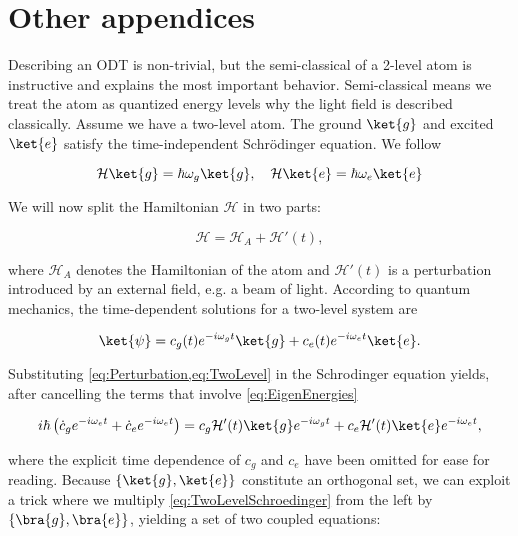 \chapter{Other appendices}



Describing an ODT is non-trivial, but the semi-classical of a 2-level atom is instructive and explains the most important behavior. Semi-classical means we treat the atom as quantized energy levels why the light field is described classically. Assume we have a two-level atom. The ground $\ket{g}$ and excited $\ket{e}$ satisfy the time-independent Schrödinger equation. We follow \cite{Leeuwen2017}

\begin{equation}\label{eq:EigenEnergies}
	\mathcal{H} \ket{g} = \hbar \omega_g \ket{g}, \quad \mathcal{H} \ket{e} = \hbar \omega_e \ket{e}
\end{equation}

We will now split the Hamiltonian $\mathcal{H}$ in two parts:

\begin{equation}\label{eq:Perturbation}
	\mathcal{H} = \mathcal{H}_A + \mathcal{H}'(t),
\end{equation}

where $\mathcal{H}_A$ denotes the Hamiltonian of the atom and $\mathcal{H}'(t)$ is a perturbation introduced by an external field, e.g. a beam of light. According to quantum mechanics, the time-dependent solutions for a two-level system are 

\begin{equation}\label{eq:TwoLevel}
	\ket{\psi} = c_g(t) e^{-i \omega_g t} \ket{g} + c_e(t) e^{-i \omega_e t} \ket{e}.
\end{equation}

Substituting \cref{eq:Perturbation,eq:TwoLevel} in the Schrodinger equation yields, after cancelling the terms that involve \cref{eq:EigenEnergies} 

\begin{equation}\label{eq:TwoLevelSchroedinger}
	i \hbar \left(\dot{c}_g e^{-i \omega_e t}+\dot{c}_e e^{-i \omega_e t} \right) = c_g \mathcal{H}'(t)\ket{g} e^{-i \omega_g t} + c_e \mathcal{H}'(t) \ket{e} e^{-i \omega_e t},
\end{equation}

where the explicit time dependence of $c_g$ and $c_e$ have been omitted for ease for reading. Because $\{\ket{g},\ket{e}\}$ constitute an orthogonal set, we can exploit a trick where we multiply \cref{eq:TwoLevelSchroedinger} from the left by $\{\bra{g},\bra{e}\}$, yielding a set of two coupled equations:

